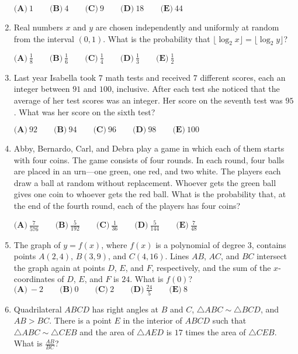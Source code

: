 \documentclass{article}
\begin{document}
\begin{enumerate}[label=\arabic*., itemsep=0.5em]
$\textbf{(A)}\ 1\qquad\textbf{(B)}\ 4\qquad\textbf{(C)}\ 9\qquad\textbf{(D)}\ 18\qquad\textbf{(E)}\ 44$\par \vspace{0.5em}\item Real numbers $x$ and $y$ are chosen independently and uniformly at random from the interval $(0,1)$. What is the probability that $\lfloor\log_2x\rfloor=\lfloor\log_2y\rfloor$?

$\textbf{(A)}\ \frac{1}{8}\qquad\textbf{(B)}\ \frac{1}{6}\qquad\textbf{(C)}\ \frac{1}{4}\qquad\textbf{(D)}\ \frac{1}{3}\qquad\textbf{(E)}\ \frac{1}{2}$\par \vspace{0.5em}\item Last year Isabella took $7$ math tests and received $7$ different scores, each an integer between $91$ and $100$, inclusive. After each test she noticed that the average of her test scores was an integer. Her score on the seventh test was $95$. What was her score on the sixth test?

$\textbf{(A)}\ 92\qquad\textbf{(B)}\ 94\qquad\textbf{(C)}\ 96\qquad\textbf{(D)}\ 98\qquad\textbf{(E)}\ 100$\par \vspace{0.5em}\item Abby, Bernardo, Carl, and Debra play a game in which each of them starts with four coins. The game consists of four rounds. In each round, four balls are placed in an urn---one green, one red, and two white. The players each draw a ball at random without replacement. Whoever gets the green ball gives one coin to whoever gets the red ball. What is the probability that, at the end of the fourth round, each of the players has four coins?

$\textbf{(A)}\ \frac{7}{576} \qquad \textbf{(B)}\ \frac{5}{192} \qquad \textbf{(C)}\ \frac{1}{36} \qquad \textbf{(D)}\ \frac{5}{144} \qquad\textbf{(E)}\ \frac{7}{48}$\par \vspace{0.5em}\item The graph of $y=f(x)$, where $f(x)$ is a polynomial of degree $3$, contains points $A(2,4)$, $B(3,9)$, and $C(4,16)$. Lines $AB$, $AC$, and $BC$ intersect the graph again at points $D$, $E$, and $F$, respectively, and the sum of the $x$-coordinates of $D$, $E$, and $F$ is $24$. What is $f(0)$?
$\textbf{(A)}\ -2 \qquad \textbf{(B)}\ 0 \qquad \textbf{(C)}\ 2 \qquad \textbf{(D)}\ \frac{24}{5} \qquad\textbf{(E)}\ 8$\par \vspace{0.5em}\item Quadrilateral $ABCD$ has right angles at $B$ and $C$, $\triangle ABC \sim \triangle BCD$, and $AB > BC$. There is a point $E$ in the interior of $ABCD$ such that $\triangle ABC \sim \triangle CEB$ and the area of $\triangle AED$ is $17$ times the area of $\triangle CEB$. What is $\frac{AB}{BC}$?


\end{enumerate}
\end{document}
